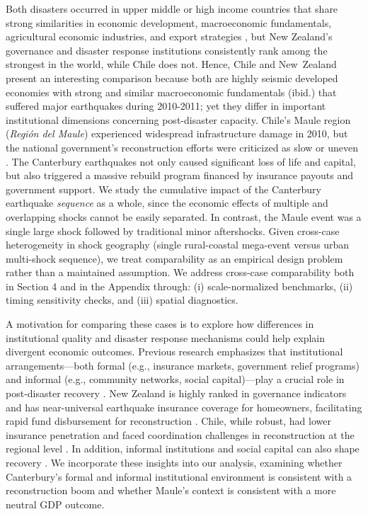 \documentclass[12pt]{article}
\begin{document}
Both disasters occurred in upper middle or high income countries that share strong similarities in economic development, macroeconomic fundamentals, agricultural economic industries, and export strategies \parencite{gonzalez2020diversificacion}, but New Zealand's governance and disaster response institutions consistently rank among the strongest in the world, while Chile does not. Hence, Chile and New Zealand present an interesting comparison because both are highly seismic developed economies with strong and similar macroeconomic fundamentals (ibid.) that suffered major earthquakes during 2010-2011; yet they differ in important institutional dimensions concerning post-disaster capacity. Chile’s Maule region (\textit{Región del Maule}) experienced widespread infrastructure damage in 2010, but the national government’s reconstruction efforts were criticized as slow or uneven \parencite{dussaillant2014trust, cardenasjiron2012chilean}. The Canterbury earthquakes not only caused significant loss of life and capital, but also triggered a massive rebuild program financed by insurance payouts and government support. We study the cumulative impact of the Canterbury earthquake \textit{sequence} as a whole, since the economic effects of multiple and overlapping shocks cannot be easily separated. In contrast, the Maule event was a single large shock followed by traditional minor aftershocks. Given cross-case heterogeneity in shock geography (single rural-coastal mega-event versus urban multi-shock sequence), we treat comparability as an empirical design problem rather than a maintained assumption. We address cross-case comparability both in Section 4 and in the Appendix through: (i) scale-normalized benchmarks, (ii) timing sensitivity checks, and (iii) spatial diagnostics.

A motivation for comparing these cases is to explore how differences in institutional quality and disaster response mechanisms could help explain divergent economic outcomes. Previous research emphasizes that institutional arrangements—both formal (e.g., insurance markets, government relief programs) and informal (e.g., community networks, social capital)—play a crucial role in post-disaster recovery \parencite{noy2009macroeconomic, rayamajhee2022coproduction, storr2016community, storr2017sandy}. New Zealand is highly ranked in governance indicators and has near-universal earthquake insurance coverage for homeowners, facilitating rapid fund disbursement for reconstruction \parencite{nguyen2020insurance}. Chile, while robust, had lower insurance penetration and faced coordination challenges in reconstruction at the regional level \parencite{cardenasjiron2012chilean, eclac2010overview}. In addition, informal institutions and social capital can also shape recovery \parencite{GrubeStorr2018, storr2016community}. We incorporate these insights into our analysis, examining whether Canterbury’s formal and informal institutional environment is consistent with a reconstruction boom and whether Maule's context is consistent with a more neutral GDP outcome.
\end{document}
